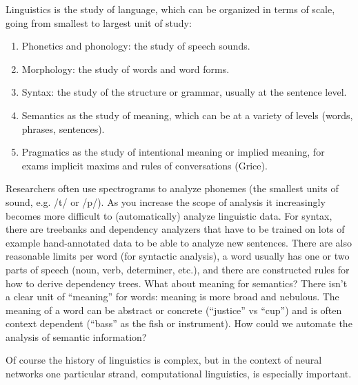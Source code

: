 Linguistics is the study of language, which can be organized in terms of scale, going from smallest to largest unit of study: 
\begin{enumerate}
\item Phonetics and phonology: the study of speech sounds.
\item Morphology: the study of words and word forms.
\item Syntax: the study of the structure or grammar, usually at the sentence level.
\item Semantics as the study of meaning, which can be at a variety of levels (words, phrases, sentences).
\item Pragmatics as the study of intentional meaning or implied meaning, for exams implicit maxims and rules of conversations (Grice). 
\end{enumerate}

Researchers often use spectrograms to analyze phonemes (the smallest units of sound, e.g. /t/ or /p/). As you increase the scope of analysis it increasingly becomes more difficult to (automatically) analyze linguistic data. For syntax, there are treebanks and dependency analyzers that have to be trained on lots of example hand-annotated data to be able to analyze new sentences. There are also reasonable limits per word (for syntactic analysis), a word usually has one or two parts of speech (noun, verb, determiner, etc.), and there are constructed rules for how to derive dependency trees. What about meaning for semantics? There isn't a clear unit of ``meaning'' for words: meaning is more broad and nebulous. The meaning of a word can be abstract or concrete (``justice'' vs ``cup'') and is often context dependent (``bass'' as the fish or instrument). How could we automate the analysis of semantic information?

Of course the history of linguistics is complex, but in the context of neural networks one particular strand, computational linguistics, is especially important. 


